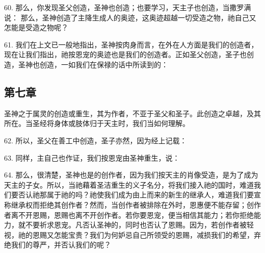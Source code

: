 60. 那么，你发现圣父创造，圣神也创造；也要学习，天主子也创造，当撒罗满说：  那么，圣神创造了主降生成人的奥迹，这奥迹超越一切受造之物，祂自己又怎能是受造之物呢？\par

61. 我们在上文已一般地指出，圣神按肉身而言，在外在人方面是我们的创造者，现在让我们指出，祂按恩宠的奥迹也是我们的创造者。正如圣父创造，圣子也创造，圣神也创造，一如我们在保禄的话中所读到的：\par


\subsection{第七章}

圣神之于属灵的创造或重生，其为作者，不亚于圣父和圣子。此创造之卓越，及其所在。当圣经将身体或肢体归于天主时，我们当如何理解。\par

62. 所以，圣父在善工中创造，圣子亦然，因为经上记载： \par

63. 同样，主自己也作证，我们按恩宠由圣神重生，说：\par

64. 那么，很清楚，圣神也是的创作者，因为我们按天主的肖像受造，是为了成为天主的子女。所以，当祂藉着圣洁重生的义子名分，将我们接入祂的国时，难道我们要否认祂那属于祂的吗？祂使我们成为由上而来的新生的继承人，难道我们要宣称继承权而拒绝其创作者？然而，当创作者被排除在外时，恩惠便不能存留；创作者离不开恩赐，恩赐也离不开创作者。若你要恩宠，便当相信其能力；若你拒绝能力，就不要祈求恩宠。凡否认圣神的，同时也否认了恩赐。因为，若创作者被轻视，祂的恩赐又怎能宝贵？我们为何妒忌自己所领受的恩赐，减损我们的希望，弃绝我们的尊严，并否认我们的呢？\par

